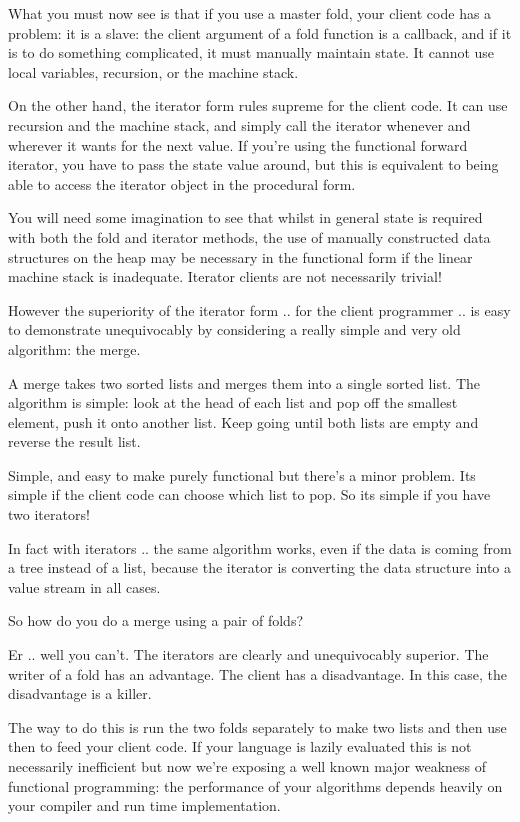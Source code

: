 \documentclass[oneside]{book}
\begin{document}
What you must now see is that if you use a master fold, your client
code has a problem: it is a slave: the client argument of a fold
function is a callback, and if it is to do something complicated,
it must manually maintain state. It cannot use local variables,
recursion, or the machine stack.

On the other hand, the iterator form rules supreme for the client
code. It can use recursion and the machine stack, and simply call
the iterator whenever and wherever it wants for the next value.
If you're using the functional forward iterator, you have to pass
the state value around, but this is equivalent to being able
to access the iterator object in the procedural form.

You will need some imagination to see that whilst in general
state is required with both the fold and iterator methods,
the use of manually constructed data structures on the heap
may be necessary in the functional form 
if the linear machine stack is inadequate. Iterator clients
are not necessarily trivial!

However the superiority of the iterator form .. for the client
programmer .. is easy to demonstrate unequivocably by considering
a really simple and very old algorithm: the merge.

A merge takes two sorted lists and merges them into a single
sorted list. The algorithm is simple: look at the head of each
list and pop off the smallest element, push it onto another list.
Keep going until both lists are empty and reverse the result list.

Simple, and easy to make purely functional but there's a minor
problem. Its simple if the client code can choose which list to pop.
So its simple if you have two iterators! 

In fact with iterators .. the same algorithm works, even if the data
is coming from a tree instead of a list, because the iterator is
converting the data structure into a value stream in all cases.

So how do you do a merge using a pair of folds?

Er .. well you can't. The iterators are clearly and unequivocably
superior. The writer of a fold has an advantage. The client has
a disadvantage. In this case, the disadvantage is a killer.

The way to do this is run the two folds separately to make two lists
and then use then to feed your client code. If your language is lazily
evaluated this is not necessarily inefficient but now we're exposing
a well known major weakness of functional programming: the performance
of your algorithms depends heavily on your compiler and run time
implementation.
\end{document}
